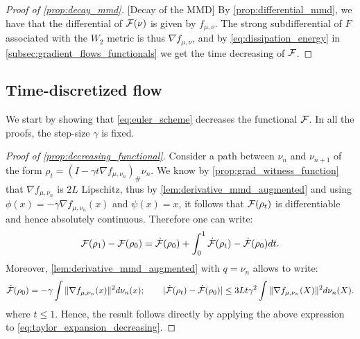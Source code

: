 
\begin{proof}[Proof of \cref{prop:decay_mmd}]\label{proof:prop:decay_mmd}[Decay of the MMD]
By \eqref{prop:differential_mmd}, we have that the differential of ${{\mathcal F}}(\nu)$ is given by $f_{\mu,\nu}$. The strong subdifferential of $F$ associated with the $W_2$ metric is thus $\nabla f_{\mu, \nu}$, and by \eqref{eq:dissipation_energy} in \cref{subsec:gradient_flows_functionals} we get the time decreasing of ${{\mathcal F}}$.
\end{proof}




\subsection{Time-discretized flow}\label{appendix:subsec:convegence_time_discrete}
We start by showing that \cref{eq:euler_scheme} decreases the functional ${{\mathcal F}}$. In all the proofs, the step-size $\gamma$ is fixed.

\begin{proof}[Proof of \cref{prop:decreasing_functional}]\label{proof:prop:decreasing_functional}
	Consider a path between $\nu_n$ and $\nu_{n+1}$ of the form $\rho_t	=(I-\gamma t\nabla f_{\mu,\nu_n})_{\#}\nu_n$. We know by \cref{prop:grad_witness_function} that $\nabla f_{\mu,\nu_n}$ is $2L$ Lipschitz, thus by \cref{lem:derivative_mmd_augmented} and using $\phi(x) = -\gamma \nabla f_{\mu,\nu_n}(x)$ and $\psi(x) = x$, it follows that ${{\mathcal F}}(\rho_t)$ is differentiable and hence absolutely continuous. Therefore one can write:
	\begin{align}\label{eq:taylor_expansion_decreasing}
	\mathcal{F}(\rho_1)-\mathcal{F}(\rho_0) = \dot{\mathcal{F}}(\rho_0)+  \int_0^1 \dot{{{\mathcal F}}}(\rho_t)- \dot{{{\mathcal F}}}(\rho_0)dt.
	\end{align}
	Moreover, \cref{lem:derivative_mmd_augmented} with $q=\nu_n$ allows to write:
	\begin{align*}
		\dot{\mathcal{F}}(\rho_0) = -\gamma \int \Vert \nabla f_{\mu,\nu_n}(x) \Vert^2 d\nu_n(x); \qquad \vert \dot{{{\mathcal F}}}(\rho_t)- \dot{{{\mathcal F}}}(\rho_0)\vert \leq 3L t\gamma^2 \int \Vert \nabla f_{\mu,\nu_n}(X) \Vert^2 d\nu_n(X).
	\end{align*}
	where $t\le 1$. Hence, the result follows directly by applying the above expression to \cref{eq:taylor_expansion_decreasing}.
\end{proof}

